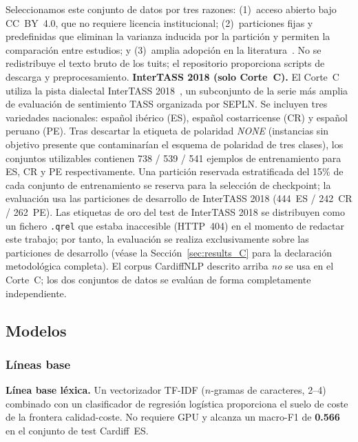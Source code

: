 \documentclass[conference]{IEEEtran}
\begin{document}
Seleccionamos este conjunto de datos por tres razones: (1)~acceso abierto bajo
CC~BY~4.0, que no requiere licencia institucional; (2)~particiones fijas y
predefinidas que eliminan la varianza inducida por la partición y permiten la
comparación entre estudios; y (3)~amplia adopción en la
literatura~\cite{barbieri2022xlmt}.
No se redistribuye el texto bruto de los tuits; el repositorio proporciona
scripts de descarga y preprocesamiento.
\textbf{InterTASS 2018 (solo Corte~C).}
El Corte~C utiliza la pista dialectal InterTASS 2018~\cite{martinezcamara2018tass},
un subconjunto de la serie más amplia de evaluación de sentimiento TASS
organizada por SEPLN.
Se incluyen tres variedades nacionales: español ibérico (ES), español
costarricense (CR) y español peruano (PE).
Tras descartar la etiqueta de polaridad \textit{NONE} (instancias sin objetivo
presente que contaminarían el esquema de polaridad de tres clases), los
conjuntos utilizables contienen 738 / 539 / 541 ejemplos de entrenamiento para
ES, CR y PE respectivamente.
Una partición reservada estratificada del 15\% de cada conjunto de entrenamiento
se reserva para la selección de checkpoint; la evaluación usa las particiones de
desarrollo de InterTASS 2018 (444~ES / 242~CR / 262~PE).
Las etiquetas de oro del test de InterTASS 2018 se distribuyen como un fichero
\texttt{.qrel} que estaba inaccesible (HTTP~404) en el momento de redactar este
trabajo; por tanto, la evaluación se realiza exclusivamente sobre las
particiones de desarrollo (véase la Sección~\ref{sec:results_C} para la
declaración metodológica completa).
El corpus CardiffNLP descrito arriba \emph{no} se usa en el Corte~C; los dos
conjuntos de datos se evalúan de forma completamente independiente.

\subsection{Modelos}
\label{sec:methodology_models}

\subsubsection*{Líneas base}
\label{sec:methodology_baselines}

\textbf{Línea base léxica.}
Un vectorizador TF-IDF ($n$-gramas de caracteres, 2--4) combinado con un
clasificador de regresión logística proporciona el suelo de coste de la frontera
calidad-coste.
No requiere GPU y alcanza un macro-F1 de \textbf{0.566} en el conjunto de test
Cardiff~ES.
\end{document}

